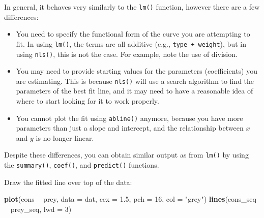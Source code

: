 \documentclass[]{book}
\newenvironment{Shaded}{\begin{snugshade}}{\end{snugshade}}
\newcommand{\KeywordTok}[1]{\textcolor[rgb]{0.13,0.29,0.53}{\textbf{#1}}}
\newcommand{\DataTypeTok}[1]{\textcolor[rgb]{0.13,0.29,0.53}{#1}}
\newcommand{\DecValTok}[1]{\textcolor[rgb]{0.00,0.00,0.81}{#1}}
\newcommand{\FloatTok}[1]{\textcolor[rgb]{0.00,0.00,0.81}{#1}}
\newcommand{\StringTok}[1]{\textcolor[rgb]{0.31,0.60,0.02}{#1}}
\newcommand{\OperatorTok}[1]{\textcolor[rgb]{0.81,0.36,0.00}{\textbf{#1}}}
\newcommand{\NormalTok}[1]{#1}
\providecommand{\tightlist}{%
  \setlength{\itemsep}{0pt}\setlength{\parskip}{0pt}}
\theoremstyle{definition}
\theoremstyle{definition}
\theoremstyle{definition}
\theoremstyle{remark}
\begin{document}
In general, it behaves very similarly to the \texttt{lm()} function,
however there are a few differences:

\begin{itemize}
\tightlist
\item
  You need to specify the functional form of the curve you are
  attempting to fit. In using \texttt{lm()}, the terms are all additive
  (e.g., \texttt{type\ +\ weight}), but in using \texttt{nls()}, this is
  not the case. For example, note the use of division.
\item
  You may need to provide starting values for the parameters
  (coefficients) you are estimating. This is because \texttt{nls()} will
  use a search algorithm to find the parameters of the best fit line,
  and it may need to have a reasonable idea of where to start looking
  for it to work properly.
\item
  You cannot plot the fit using \texttt{abline()} anymore, because you
  have more parameters than just a slope and intercept, and the
  relationship between \(x\) and \(y\) is no longer linear.
\end{itemize}

Despite these differences, you can obtain similar output as from
\texttt{lm()} by using the \texttt{summary()}, \texttt{coef()}, and
\texttt{predict()} functions.

\begin{Shaded}
\end{Shaded}

Draw the fitted line over top of the data:

\begin{Shaded}
\begin{Highlighting}[]
\KeywordTok{plot}\NormalTok{(cons }\OperatorTok{~}\StringTok{ }\NormalTok{prey, }\DataTypeTok{data =}\NormalTok{ dat, }\DataTypeTok{cex =} \FloatTok{1.5}\NormalTok{, }\DataTypeTok{pch =} \DecValTok{16}\NormalTok{, }\DataTypeTok{col =} \StringTok{"grey"}\NormalTok{)}
\KeywordTok{lines}\NormalTok{(cons_seq }\OperatorTok{~}\StringTok{ }\NormalTok{prey_seq, }\DataTypeTok{lwd =} \DecValTok{3}\NormalTok{)}
\end{Highlighting}
\end{Shaded}
\end{document}
